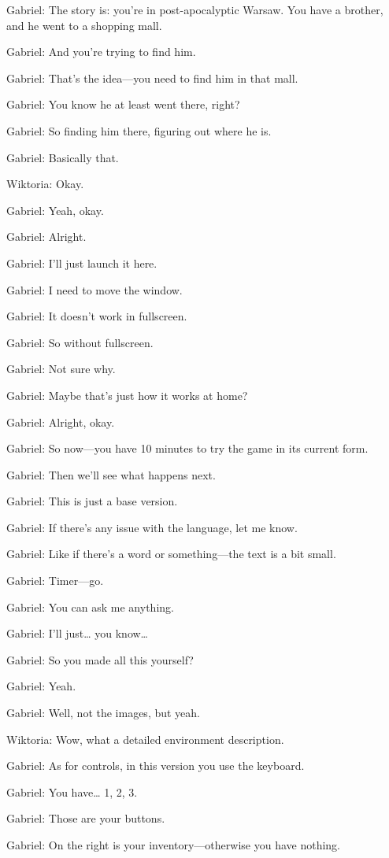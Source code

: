Gabriel: The story is: you’re in post-apocalyptic Warsaw. You have a brother, and he went to a shopping mall.

Gabriel: And you’re trying to find him.

Gabriel: That’s the idea—you need to find him in that mall.

Gabriel: You know he at least went there, right?

Gabriel: So finding him there, figuring out where he is.

Gabriel: Basically that.

Wiktoria: Okay.

Gabriel: Yeah, okay.

Gabriel: Alright.

Gabriel: I’ll just launch it here.

Gabriel: I need to move the window.

Gabriel: It doesn’t work in fullscreen.

Gabriel: So without fullscreen.

Gabriel: Not sure why.

Gabriel: Maybe that’s just how it works at home?

Gabriel: Alright, okay.

Gabriel: So now—you have 10 minutes to try the game in its current form.

Gabriel: Then we’ll see what happens next.

Gabriel: This is just a base version.

Gabriel: If there’s any issue with the language, let me know.

Gabriel: Like if there’s a word or something—the text is a bit small.

Gabriel: Timer—go.

Gabriel: You can ask me anything.

Gabriel: I’ll just… you know…

Gabriel: So you made all this yourself?

Gabriel: Yeah.

Gabriel: Well, not the images, but yeah.

Wiktoria: Wow, what a detailed environment description.

Gabriel: As for controls, in this version you use the keyboard.

Gabriel: You have… 1, 2, 3.

Gabriel: Those are your buttons.

Gabriel: On the right is your inventory—otherwise you have nothing.

